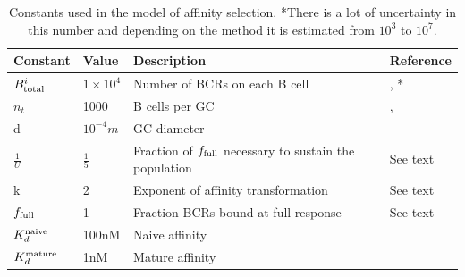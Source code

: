 \begin{table}[ht]
\centering
\begin{tabular}{llll}
Constant    & Value & Description & Reference \\ \hline
$B^i_{\text{total}}$ & $1\times10^{4}$     & Number of BCRs on each B cell & \cite{immprot}, \cite{rieckmann2017social}*     \\
$n_t$ & 1000 & B cells per GC &  \cite{kroese1990germinal}, \cite{Childs_Baskerville_Cobey_2015} \\
d & $10^{-4} m$ & GC diameter &  \cite{Romppanen_1981} \\
$\frac{1}{U}$           & $\frac{1}{5}$     & Fraction of $f_{\text{full}}$ necessary to sustain the population & See text \\
k           & 2     & Exponent of affinity transformation & See text  \\
$f_{\text{full}}$  & 1     & Fraction BCRs bound at full response & See text \\
$K_d^{\text{naive}}$ & 100nM & Naive affinity & \cite{berek1987mutation} \\
$K_d^{\text{mature}}$ & 1nM & Mature affinity & \cite{berek1987mutation} \\
\end{tabular}
\caption{
\label{constants}
    Constants used in the model of affinity selection. *There is a lot of uncertainty in this number and depending on the method it is estimated from $10^3$ to $10^7$.}
\end{table}









